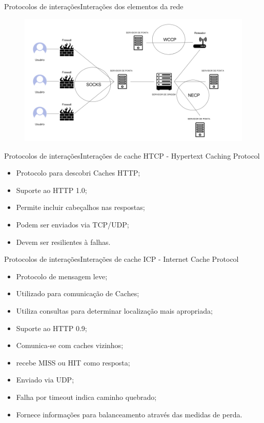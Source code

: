 \documentclass{beamer}
\begin{document}
\begin{frame}{Protocolos de intera\c{c}\~oes}{Intera\c{c}\~oes dos elementos da rede}
\begin{figure} 
\includegraphics[width=13cm]{Figuras/protocolos_interacao_elementos.png} 
\label{figura:protocolos_interacao_elementos}
\end{figure}
\end{frame}

\begin{frame}{Protocolos de intera\c{c}\~oes}{Intera\c{c}\~oes de cache}
HTCP - Hypertext Caching Protocol
\begin{itemize}
\item Protocolo para descobri Caches HTTP;
\item Suporte ao HTTP 1.0;
\item Permite incluir cabeçalhos nas respostas;
\item Podem ser enviados via TCP/UDP;
\item Devem ser resilientes \`a falhas.
\end{itemize}
\end{frame}

\begin{frame}{Protocolos de intera\c{c}\~oes}{Intera\c{c}\~oes de cache}
ICP - Internet Cache Protocol
\begin{itemize}
\item Protocolo de mensagem leve;
\item Utilizado para comunica\c{c}\~ao de Caches;
\item Utiliza consultas para determinar localiza\c{c}\~ao mais apropriada;
\item Suporte ao HTTP 0.9;
\item Comunica-se com caches vizinhos;
\item recebe MISS ou HIT como resposta;
\item Enviado via UDP;
\item Falha por timeout indica caminho quebrado;
\item Fornece informa\c{c}\~oes para balanceamento atrav\'es das medidas de perda.
\end{itemize}
\end{frame}
\end{document}
